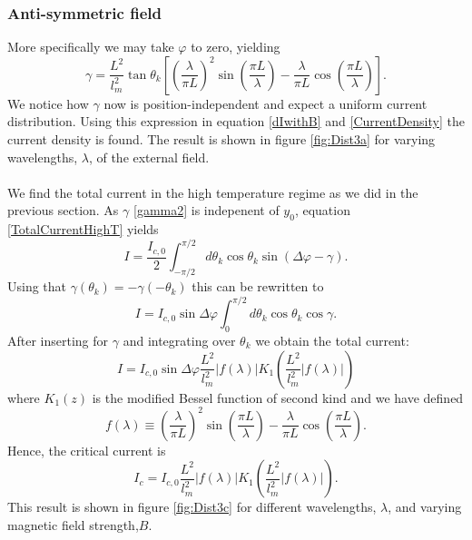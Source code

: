\subsubsection{Anti-symmetric field}
More specifically we may take $\varphi$ to zero, yielding
\begin{equation}
\gamma = \frac{L^2}{l_m^2}\tan\theta_k\left[\left(\frac{\lambda}{\pi L}\right)^2\sin\left(\frac{\pi L}{\lambda}\right)-\frac{\lambda}{\pi L}\cos\left(\frac{\pi L}{\lambda}\right)\right].
\end{equation}
We notice how $\gamma$ now is position-independent and expect a uniform current distribution. Using this expression in equation \eqref{dIwithB} and \eqref{CurrentDensity} the current density is found. The result is shown in figure \ref{fig:Dist3a} for varying wavelengths, $\lambda$, of the external field.
\\
\\
We find the total current in the high temperature regime as we did in the previous section. As $\gamma$ \eqref{gamma2} is indepenent of $y_0$, equation \eqref{TotalCurrentHighT} yields
\begin{equation}
I = \frac{I_{c,0}}{2}\int_{-\pi/2}^{\pi/2}d\theta_k\cos\theta_k\sin(\Delta \varphi - \gamma).
\end{equation}
Using that $\gamma(\theta_k) = -\gamma(-\theta_k)$ this can be rewritten to
\begin{equation}
I = I_{c,0}\sin\Delta\varphi\int_0^{\pi/2}d\theta_k\cos\theta_k\cos\gamma.
\end{equation}
After inserting for $\gamma$ and integrating over $\theta_k$ we obtain the total current:
\begin{equation}
I = I_{c,0}\sin\Delta\varphi\frac{L^2}{l_m^2}\left|f(\lambda)\right|K_1\left(\frac{L^2}{l_m^2}\left|f(\lambda)\right|\right)
\end{equation}
where $K_1(z)$ is the modified Bessel function of second kind and we have defined
\begin{equation}
f(\lambda) \equiv \left(\frac{\lambda}{\pi L}\right)^2\sin\left(\frac{\pi L}{\lambda}\right)-\frac{\lambda}{\pi L}\cos\left(\frac{\pi L}{\lambda}\right).
\end{equation}
Hence, the critical current is
\begin{equation}
    I_c = I_{c,0}\frac{L^2}{l_m^2}\left|f(\lambda)\right|K_1\left(\frac{L^2}{l_m^2}\left|f(\lambda)\right|\right).
\end{equation}
This result is shown in figure \ref{fig:Dist3c} for different wavelengths, $\lambda$, and varying magnetic field strength,$B$.
